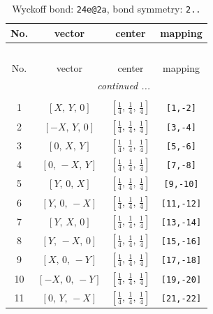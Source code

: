 \documentclass[fleqn,8pt]{jsarticle}
\begin{document}
\begin{longtable}{cccc}
\caption{Wyckoff bond: {\tt 24e@2a}, bond symmetry: {\tt 2..}}
 \\
 \hline \hline
No. & vector & center & mapping \\ \hline \endfirsthead

\multicolumn{3}{l}{\tablename\ \thetable{}} \\
 \hline \hline
No. & vector & center & mapping \\ \hline \endhead

 \hline \hline
\multicolumn{3}{r}{\footnotesize\it continued ...} \\ \endfoot

 \hline \hline
\multicolumn{3}{r}{} \\ \endlastfoot

1 & $\left[ X,\, Y,\, 0 \right]$ & $\left[ \frac{1}{4},\, \frac{1}{4},\, \frac{1}{4} \right]$ & {\tt [1,-2]} \\ \hline
2 & $\left[ - X,\, Y,\, 0 \right]$ & $\left[ \frac{1}{4},\, \frac{1}{4},\, \frac{1}{4} \right]$ & {\tt [3,-4]} \\ \hline
3 & $\left[ 0,\, X,\, Y \right]$ & $\left[ \frac{1}{4},\, \frac{1}{4},\, \frac{1}{4} \right]$ & {\tt [5,-6]} \\ \hline
4 & $\left[ 0,\, - X,\, Y \right]$ & $\left[ \frac{1}{4},\, \frac{1}{4},\, \frac{1}{4} \right]$ & {\tt [7,-8]} \\ \hline
5 & $\left[ Y,\, 0,\, X \right]$ & $\left[ \frac{1}{4},\, \frac{1}{4},\, \frac{1}{4} \right]$ & {\tt [9,-10]} \\ \hline
6 & $\left[ Y,\, 0,\, - X \right]$ & $\left[ \frac{1}{4},\, \frac{1}{4},\, \frac{1}{4} \right]$ & {\tt [11,-12]} \\ \hline
7 & $\left[ Y,\, X,\, 0 \right]$ & $\left[ \frac{1}{4},\, \frac{1}{4},\, \frac{1}{4} \right]$ & {\tt [13,-14]} \\ \hline
8 & $\left[ Y,\, - X,\, 0 \right]$ & $\left[ \frac{1}{4},\, \frac{1}{4},\, \frac{1}{4} \right]$ & {\tt [15,-16]} \\ \hline
9 & $\left[ X,\, 0,\, - Y \right]$ & $\left[ \frac{1}{4},\, \frac{1}{4},\, \frac{1}{4} \right]$ & {\tt [17,-18]} \\ \hline
10 & $\left[ - X,\, 0,\, - Y \right]$ & $\left[ \frac{1}{4},\, \frac{1}{4},\, \frac{1}{4} \right]$ & {\tt [19,-20]} \\ \hline
11 & $\left[ 0,\, Y,\, - X \right]$ & $\left[ \frac{1}{4},\, \frac{1}{4},\, \frac{1}{4} \right]$ & {\tt [21,-22]} \\ \hline

\end{longtable}
\end{document}
